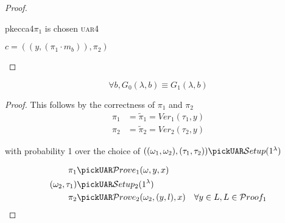 \begin{proof}
\begin{cryptogame}{pkecca4}{$\pi_1$ is chosen \textsc{uar}}{4}
        \cseqdelay
    
        {$c = ((y, (\pi_1 \cdot m_b)), \pi_2)$}{}
    
        \cseqdelay
    
        \send{}{}{}
        \receive{}{}{}
    
        \cseqdelay
    
    
    \end{cryptogame}

\end{proof}


\begin{lemma}
    \[
        \forall b, G_{0}(\lambda, b) \equiv G_{1}(\lambda, b)   
    \]
\end{lemma}

\begin{proof}
    This follows by the correctness of $\pi_1$ and $\pi_2$
    \begin{align*}
        \pi_1 &= \tilde{\pi}_1 = Ver_1(\tau_1, y) \\
        \pi_2 &= \tilde{\pi}_2 = Ver_2(\tau_2, y)
    \end{align*}

    with probability 1 over the choice of $((\omega_1, \omega_2), (\tau_1, \tau_2)) \pickUAR \mathcal{S}etup(1^\lambda)$
    
    \begin{align*}
        \pi_1 &\pickUAR \mathcal{P}rove_1(\omega, y, x) \\
        (\omega_{2}, \tau_{1}) &\pickUAR \mathcal{S}etup_{2}(1^{\lambda}) \\
        \pi_2 &\pickUAR \mathcal{P}rove_2(\omega_{2}, (y, l), x) \quad \forall y \in L , L \in \mathcal{P}roof_1
    \end{align*}
    
\end{proof}

